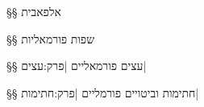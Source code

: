 §§ אלפאבית 


§§ שפות פורמאליות 


§§ עצים פורמאליים
|פרק:עצים|


§§ חתימות וביטויים פורמליים
|פרק:חתימות|



